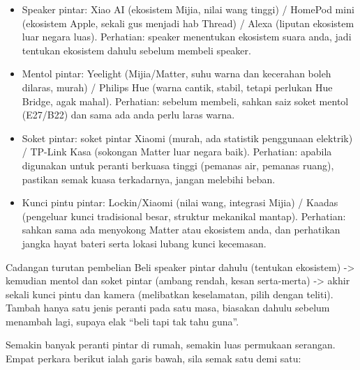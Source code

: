 \begin{itemize}
  \item Speaker pintar: Xiao AI (ekosistem Mijia, nilai wang tinggi) / HomePod mini (ekosistem Apple, sekali gus menjadi hab Thread) / Alexa (liputan ekosistem luar negara luas). Perhatian: speaker menentukan ekosistem suara anda, jadi tentukan ekosistem dahulu sebelum membeli speaker.
  \item Mentol pintar: Yeelight (Mijia/Matter, suhu warna dan kecerahan boleh dilaras, murah) / Philips Hue (warna cantik, stabil, tetapi perlukan Hue Bridge, agak mahal). Perhatian: sebelum membeli, sahkan saiz soket mentol (E27/B22) dan sama ada anda perlu laras warna.
  \item Soket pintar: soket pintar Xiaomi (murah, ada statistik penggunaan elektrik) / TP-Link Kasa (sokongan Matter luar negara baik). Perhatian: apabila digunakan untuk peranti berkuasa tinggi (pemanas air, pemanas ruang), pastikan semak kuasa terkadarnya, jangan melebihi beban.
  \item Kunci pintu pintar: Lockin/Xiaomi (nilai wang, integrasi Mijia) / Kaadas (pengeluar kunci tradisional besar, struktur mekanikal mantap). Perhatian: sahkan sama ada menyokong Matter atau ekosistem anda, dan perhatikan jangka hayat bateri serta lokasi lubang kunci kecemasan.
\end{itemize}

\begin{tcbinfo}{Cadangan turutan pembelian}
Beli speaker pintar dahulu (tentukan ekosistem) -> kemudian mentol dan soket pintar (ambang rendah, kesan serta-merta) -> akhir sekali kunci pintu dan kamera (melibatkan keselamatan, pilih dengan teliti). Tambah hanya satu jenis peranti pada satu masa, biasakan dahulu sebelum menambah lagi, supaya elak “beli tapi tak tahu guna”.

\end{tcbinfo}


Semakin banyak peranti pintar di rumah, semakin luas permukaan serangan. Empat perkara berikut ialah garis bawah, sila semak satu demi satu:

